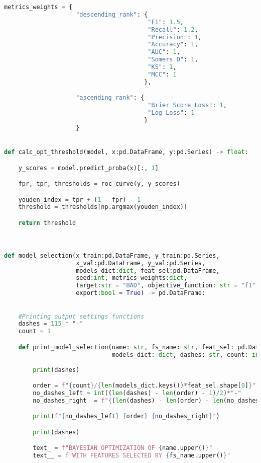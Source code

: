 \begin{lstlisting}[language=Python, basicstyle=\footnotesize\ttfamily]
metrics_weights = {
                    "descending_rank": {
                                        "F1": 1.5,
                                        "Recall": 1.2,
                                        "Precision": 1,
                                        "Accuracy": 1,
                                        "AUC": 1,
                                        "Somers D": 1,
                                        "KS": 1,
                                        "MCC": 1
                                       },

                    "ascending_rank": {
                                        "Brier Score Loss": 1,
                                        "Log Loss": 1
                                       }
                    }


def calc_opt_threshold(model, x:pd.DataFrame, y:pd.Series) -> float:

    y_scores = model.predict_proba(x)[:, 1]

    fpr, tpr, thresholds = roc_curve(y, y_scores)

    youden_index = tpr + (1 - fpr) - 1
    threshold = thresholds[np.argmax(youden_index)]

    return threshold



def model_selection(x_train:pd.DataFrame, y_train:pd.Series,
                    x_val:pd.DataFrame, y_val:pd.Series,
                    models_dict:dict, feat_sel:pd.DataFrame,
                    seed:int, metrics_weights:dict,
                    target:str = "BAD", objective_function: str = "f1",
                    export:bool = True) -> pd.DataFrame:
    

    #Printing output settings functions
    dashes = 115 * "-"
    count = 1

    def print_model_selection(name: str, fs_name: str, feat_sel: pd.DataFrame,
                              models_dict: dict, dashes: str, count: int):
        
        print(dashes)

        order = f"{count}/{len(models_dict.keys())*feat_sel.shape[0]}"
        no_dashes_left = int((len(dashes) - len(order) - 1)/2)*"-"
        no_dashes_right  = f"{(len(dashes) - len(order) - len(no_dashes_left) - 2)*'-'}"

        print(f"{no_dashes_left} {order} {no_dashes_right}")

        print(dashes)

        text_ = f"BAYESIAN OPTIMIZATION OF {name.upper()}"
        text__ = f"WITH FEATURES SELECTED BY {fs_name.upper()}"
            

\end{lstlisting}
